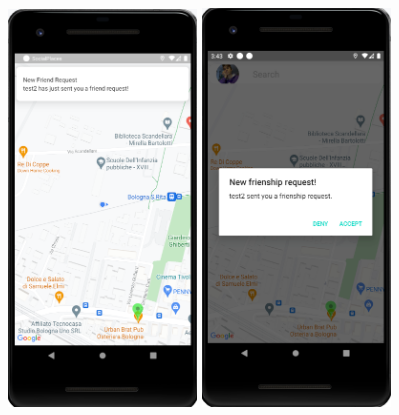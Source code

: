 \documentclass[../../main]{subfiles}
\begin{document}
\begin{figure}[H]
    \centering
    \includegraphics[width=50mm,height=120mm]{images/app/notification/friend/friend_request_notification.png}
    \includegraphics[width=50mm,height=120mm]{images/app/notification/friend/dialog_friend_request.png}

\end{figure}
\end{document}
